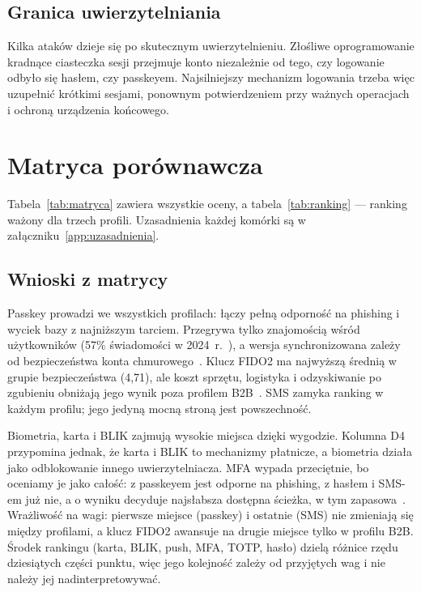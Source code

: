 \documentclass[11pt,a4paper]{article}
\begin{document}
\subsection{Granica uwierzytelniania}
Kilka ataków dzieje się po skutecznym uwierzytelnieniu. Złośliwe oprogramowanie kradnące ciasteczka sesji przejmuje konto niezależnie od tego, czy logowanie odbyło się hasłem, czy passkeyem. Najsilniejszy mechanizm logowania trzeba więc uzupełnić krótkimi sesjami, ponownym potwierdzeniem przy ważnych operacjach i ochroną urządzenia końcowego.

\section{Matryca porównawcza}\label{sec:matryca}

Tabela~\ref{tab:matryca} zawiera wszystkie oceny, a tabela~\ref{tab:ranking} --- ranking ważony dla trzech profili. Uzasadnienia każdej komórki są w załączniku~\ref{app:uzasadnienia}.

\begin{landscape}

\end{landscape}



\subsection{Wnioski z matrycy}
Passkey prowadzi we wszystkich profilach: łączy pełną odporność na phishing i wyciek bazy z najniższym tarciem. Przegrywa tylko znajomością wśród użytkowników (57\% świadomości w 2024~r.~\cite{R1}), a wersja synchronizowana zależy od bezpieczeństwa konta chmurowego~\cite{P5}. Klucz FIDO2 ma najwyższą średnią w grupie bezpieczeństwa (4,71), ale koszt sprzętu, logistyka i odzyskiwanie po zgubieniu obniżają jego wynik poza profilem B2B~\cite{P3}. SMS zamyka ranking w każdym profilu; jego jedyną mocną stroną jest powszechność.

Biometria, karta i BLIK zajmują wysokie miejsca dzięki wygodzie. Kolumna D4 przypomina jednak, że karta i BLIK to mechanizmy płatnicze, a biometria działa jako odblokowanie innego uwierzytelniacza. MFA wypada przeciętnie, bo oceniamy je jako całość: z passkeyem jest odporne na phishing, z hasłem i SMS-em już nie, a o wyniku decyduje najsłabsza dostępna ścieżka, w tym zapasowa~\cite{P11}.
Wrażliwość na wagi: pierwsze miejsce (passkey) i ostatnie (SMS) nie zmieniają się między profilami, a klucz FIDO2 awansuje na drugie miejsce tylko w profilu B2B. Środek rankingu (karta, BLIK, push, MFA, TOTP, hasło) dzielą różnice rzędu dziesiątych części punktu, więc jego kolejność zależy od przyjętych wag i nie należy jej nadinterpretowywać.
\end{document}
